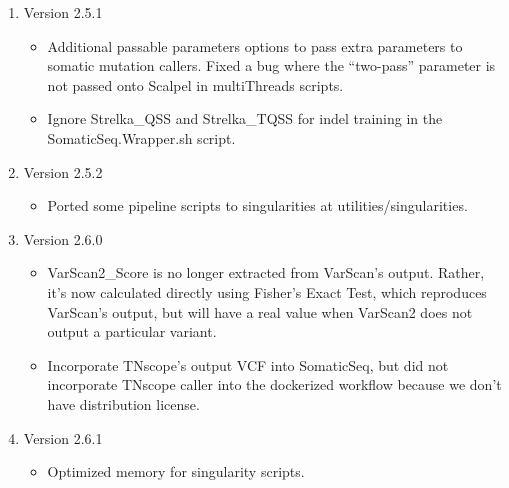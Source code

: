 \documentclass[10pt,letterpaper]{article}
\begin{document}
\begin{sloppypar}
\begin{enumerate}
\begin{itemize}
		\end{itemize}
	
	
	
	\item Version 2.5.1
	
		\begin{itemize}
		  \item
		  Additional passable parameters options to pass extra parameters to somatic mutation callers. Fixed a bug where the ``two-pass'' parameter is not passed onto Scalpel in multiThreads scripts. 
		  
		  \item
		  Ignore Strelka\_QSS and Strelka\_TQSS for indel training in the SomaticSeq.Wrapper.sh script.
		  
		\end{itemize}
	
	
	
	\item Version 2.5.2
	
		\begin{itemize}
		  \item
		  Ported some pipeline scripts to singularities at utilities/singularities.
		  
		\end{itemize}
	
	
	
	\item Version 2.6.0
	
		\begin{itemize}
		  \item
		  VarScan2\_Score is no longer extracted from VarScan's output. Rather, it's now calculated directly using Fisher's Exact Test, which reproduces VarScan's output, but will have a real value when VarScan2 does not output a particular variant. 
		  
		  \item
		  Incorporate TNscope's output VCF into SomaticSeq, but did not incorporate TNscope caller into the dockerized workflow because we don't have distribution license. 
		  
		\end{itemize}
	
	
	
	\item Version 2.6.1
	
		\begin{itemize}
		  \item
		  Optimized memory for singularity scripts.
		  

\end{itemize}
\end{enumerate}
\end{sloppypar}
\end{document}
